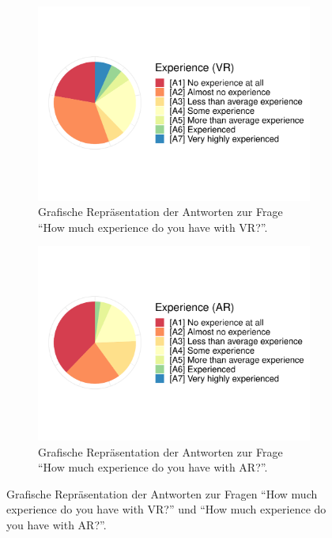 \begin{figure}[H]
	\centering
	\begin{subfigure}{0.48\textwidth}
		\includegraphics[width=\textwidth]{./_StudyResults/expVr}
		\caption{Grafische Repräsentation der Antworten zur Frage "`How much experience do you have with VR?"'.}
		\label{fig:expVr}
	\end{subfigure}%
	\hfill
	\begin{subfigure}{0.48\textwidth}
		\includegraphics[width=\textwidth]{./_StudyResults/expAr}
		\caption{Grafische Repräsentation der Antworten zur Frage "`How much experience do you have with AR?"'.}
		\label{fig:expAr}
	\end{subfigure}
	\caption{Grafische Repräsentation der Antworten zur Fragen "`How much experience do you have with VR?"' und "`How much experience do you have with AR?"'.} %
\end{figure}

